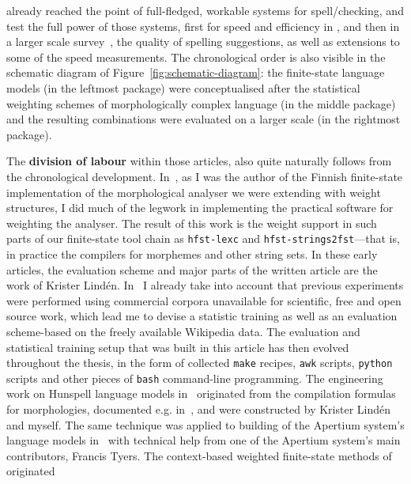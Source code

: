 \documentclass[officiallayout]{unihelcompling}
\begin{document}
already reached the point of full-fledged, workable systems for
spell\-/checking, and test the full power of those systems, first for speed and
efficiency in , and then in a larger scale
survey~, the quality of spelling suggestions, as
well as extensions to some of the speed measurements.  The chronological order
is also visible in the schematic diagram of Figure~\ref{fig:schematic-diagram}:
the finite-state language models (in the leftmost package) were conceptualised
after the statistical weighting schemes of morphologically complex language (in
the middle package) and the resulting combinations were evaluated on a larger
scale (in the rightmost package).

The \textbf{division of labour} within those articles, also quite naturally
follows from the chronological development.
In~, as I was the author
of the Finnish finite-state implementation of the morphological analyser we
were extending with weight structures, I did much of the legwork in
implementing the practical software for weighting the analyser. The result of
this work is the weight support in such parts of our finite-state tool chain as
\texttt{hfst-lexc} and \texttt{hfst-strings2fst}---that is, in practice the
compilers for morphemes and other string sets. In these early articles, the
evaluation scheme and major parts of the written article are the work of
Krister Lindén.  In~ I already take into
account that previous experiments were performed using commercial corpora
unavailable for scientific, free and open source work, which lead me to devise
a statistic training as well as an evaluation scheme-based on the freely
available Wikipedia data. The evaluation and statistical training setup that
was built in this article has then evolved throughout the thesis, in the form
of collected \texttt{make} recipes, \texttt{awk} scripts, \texttt{python}
scripts and other pieces of \texttt{bash} command-line programming. The
engineering work on Hunspell language models
in~ originated from the
compilation formulas for morphologies, documented e.g.\/
in~\cite{linden2009hfst}, and were constructed by Krister Lindén and myself.
The same technique was applied to building of the Apertium system's language
models in~ with technical help from one of the
Apertium system's main contributors, Francis Tyers.  The context-based weighted
finite-state methods of  originated
\end{document}
